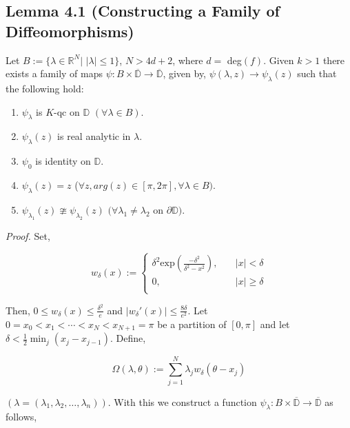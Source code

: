 \documentclass[11pt,a4paper]{article}
\begin{document}
        \subsection*{Lemma 4.1 (Constructing a Family of Diffeomorphisms)} Let $B:= \{\lambda \in \mathbb{R}^N|$ $|\lambda| \leq 1\}$, $N>4d+2$, where $d = $ deg$(f)$. Given $k>1$ there exists a family of maps $\psi:B\times \overline{\mathbb{D}} \rightarrow \overline{\mathbb{D}}$, given by, $\psi(\lambda, z) \rightarrow \psi_{\lambda}(z)$ such that the following hold:
        \begin{enumerate}
            \item $\psi_{\lambda}$ is $K$-qc on $\mathbb{D}$ $(\forall \lambda \in B)$.
            \item $\psi_{\lambda}(z)$ is real analytic in $\lambda$.
            \item $\psi_0$ is identity on $\mathbb{D}$.
            \item $\psi_{\lambda}(z) = z$ ($\forall z, arg(z) \in [\pi, 2\pi], \forall \lambda \in B)$.
            \item $\psi_{\lambda_1}(z) \ncong \psi_{\lambda_2}(z)$ $(\forall \lambda_1 \neq \lambda_2$ on $\partial \mathbb{D})$.
        \end{enumerate}


        \textit{Proof.} Set,

        $$w_{\delta}(x) :=
        \begin{cases}
        \delta^2\text{exp}\left(\frac{-\delta^2}{\delta^2 - x^2}\right), &\quad|x| < \delta\\
        0, &\quad|x| \geq \delta\\
        \end{cases}$$


        Then, $0\leq w_{\delta}(x) \leq \frac{\delta^2}{e}$ and $|w_{\delta}'(x)| \leq \frac{8\delta}{e^2}$.
        Let $0 = x_0<x_1<\cdots<x_N<x_{N+1} = \pi$ be a partition of $[0,\pi]$ and let $\delta < \frac{1}{2}\min_{j}{(x_j-x_{j-1})}$. Define,

        $$\Omega(\lambda, \theta):= \sum_{j=1}^{N}{\lambda_jw_{\delta}(\theta - x_j)}$$


        $(\lambda = (\lambda_1, \lambda_2,\ldots,\lambda_n))$. With this we construct a function $\psi_{\lambda}:B\times\overline{\mathbb{D}} \rightarrow \overline{\mathbb{D}}$ as follows,
\end{document}
